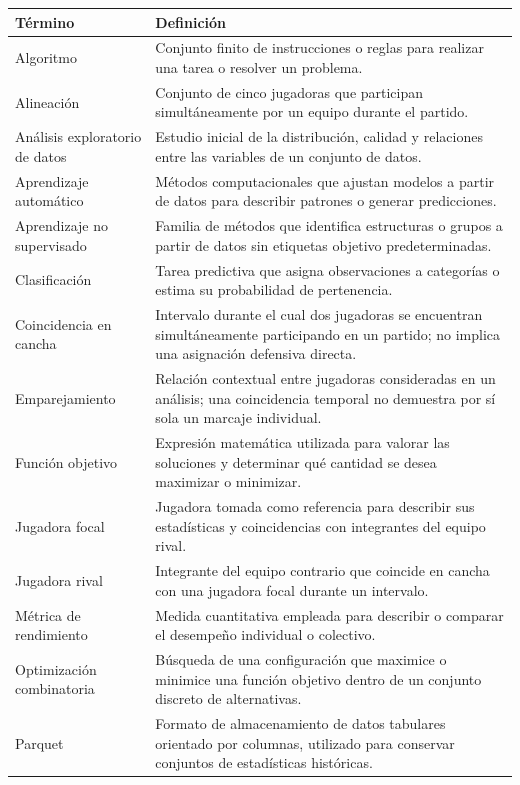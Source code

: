 \documentclass[12pt,letterpaper]{report}
\begin{document}
\begin{longtable}{@{}p{4cm}p{10cm}@{}}
\toprule
\textbf{Término} & \textbf{Definición} \\
\midrule
\endhead
Algoritmo & Conjunto finito de instrucciones o reglas para realizar una tarea o resolver un problema. \\
Alineación & Conjunto de cinco jugadoras que participan simultáneamente por un equipo durante el partido. \\
Análisis exploratorio de datos & Estudio inicial de la distribución, calidad y relaciones entre las variables de un conjunto de datos. \\
Aprendizaje automático & Métodos computacionales que ajustan modelos a partir de datos para describir patrones o generar predicciones. \\
Aprendizaje no supervisado & Familia de métodos que identifica estructuras o grupos a partir de datos sin etiquetas objetivo predeterminadas. \\
Clasificación & Tarea predictiva que asigna observaciones a categorías o estima su probabilidad de pertenencia. \\
Coincidencia en cancha & Intervalo durante el cual dos jugadoras se encuentran simultáneamente participando en un partido; no implica una asignación defensiva directa. \\
Emparejamiento & Relación contextual entre jugadoras consideradas en un análisis; una coincidencia temporal no demuestra por sí sola un marcaje individual. \\
Función objetivo & Expresión matemática utilizada para valorar las soluciones y determinar qué cantidad se desea maximizar o minimizar. \\
Jugadora focal & Jugadora tomada como referencia para describir sus estadísticas y coincidencias con integrantes del equipo rival. \\
Jugadora rival & Integrante del equipo contrario que coincide en cancha con una jugadora focal durante un intervalo. \\
Métrica de rendimiento & Medida cuantitativa empleada para describir o comparar el desempeño individual o colectivo. \\
Optimización combinatoria & Búsqueda de una configuración que maximice o minimice una función objetivo dentro de un conjunto discreto de alternativas. \\
Parquet & Formato de almacenamiento de datos tabulares orientado por columnas, utilizado para conservar conjuntos de estadísticas históricas. \\

\end{longtable}
\end{document}
